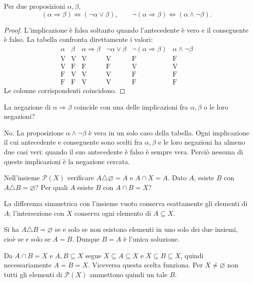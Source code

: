 \begin{proposizione}
Per due proposizioni $\alpha,\beta$,
\[
(\alpha\Rightarrow\beta)\iff(\neg\alpha\lor\beta),
\qquad \neg(\alpha\Rightarrow\beta)\iff(\alpha\land\neg\beta).
\]
\end{proposizione}
\begin{proof}
L'implicazione è falsa soltanto quando l'antecedente è vero e il conseguente è falso. La tabella confronta direttamente i valori:
\[
\begin{array}{cc|cccc}
\alpha&\beta&\alpha\Rightarrow\beta&\neg\alpha\lor\beta&\neg(\alpha\Rightarrow\beta)&\alpha\land\neg\beta\\\hline
\mathrm V&\mathrm V&\mathrm V&\mathrm V&\mathrm F&\mathrm F\\
\mathrm V&\mathrm F&\mathrm F&\mathrm F&\mathrm V&\mathrm V\\
\mathrm F&\mathrm V&\mathrm V&\mathrm V&\mathrm F&\mathrm F\\
\mathrm F&\mathrm F&\mathrm V&\mathrm V&\mathrm F&\mathrm F
\end{array}
\]
Le colonne corrispondenti coincidono.
\end{proof}

\begin{esercizio}
La negazione di $\alpha\Rightarrow\beta$ coincide con una delle implicazioni fra $\alpha,\beta$ o le loro negazioni?
\end{esercizio}
\begin{svolgimento}
No. La proposizione $\alpha\land\neg\beta$ è vera in un solo caso della tabella. Ogni implicazione il cui antecedente e conseguente sono scelti fra $\alpha,\beta$ e le loro negazioni ha almeno due casi veri: quando il suo antecedente è falso è sempre vera. Perciò nessuna di queste implicazioni è la negazione cercata.
\end{svolgimento}

\begin{esercizio}
Nell'insieme $\mathcal P(X)$ verificare $A\triangle\varnothing=A$ e $A\cap X=A$. Dato $A$, esiste $B$ con $A\triangle B=\varnothing$? Per quali $A$ esiste $B$ con $A\cap B=X$?
\end{esercizio}
\begin{svolgimento}
La differenza simmetrica con l'insieme vuoto conserva esattamente gli elementi di $A$; l'intersezione con $X$ conserva ogni elemento di $A\subseteq X$.

Si ha $A\triangle B=\varnothing$ se e solo se non esistono elementi in uno solo dei due insiemi, cioè se e solo se $A=B$. Dunque $B=A$ è l'unica soluzione.

Da $A\cap B=X$ e $A,B\subseteq X$ segue $X\subseteq A\subseteq X$ e $X\subseteq B\subseteq X$, quindi necessariamente $A=B=X$. Viceversa questa scelta funziona. Per $X\ne\varnothing$ non tutti gli elementi di $\mathcal P(X)$ ammettono quindi un tale $B$.
\end{svolgimento}

